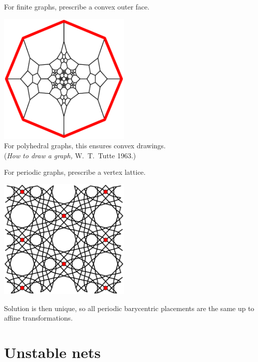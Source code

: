 \documentclass{beamer}
\begin{document}
\begin{frame}
  \begin{center}
    For finite graphs, prescribe a convex outer face.

    \includegraphics[width=2.5in]{schlegel2}\\
    For polyhedral graphs, this ensures convex drawings.\\
    ({\em How to draw a graph,} W.\ T.\ Tutte 1963.)
  \end{center}
\end{frame}

\begin{frame}
  \begin{center}
    For periodic graphs, prescribe a vertex lattice.

    \includegraphics[width=2.5in]{al-equilibrium}

    Solution is then unique, so all periodic barycentric placements are the
    same up to affine transformations.
  \end{center}
\end{frame}


\section{Unstable nets}
\end{document}

